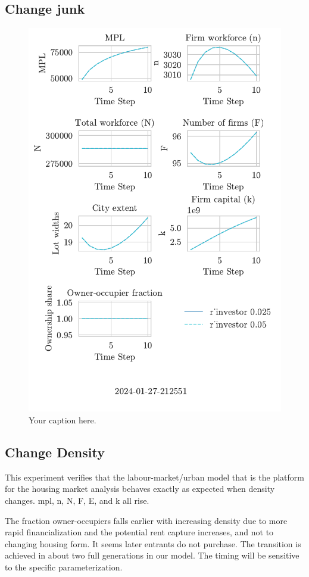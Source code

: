  \subsection{Change junk}
\begin{figure}
  \centering
  \includegraphics[width=.6\textwidth, clip, trim=0 20mm 0 0]{fig/plots/timeseries-plots-2024-01-27-212551.pdf}
  \caption{Your caption here.}
  \label{fig:your-label}
\end{figure}

 \subsection{Change Density}
 This experiment verifies that the labour-market/urban model that is the platform for the housing market analysis behaves exactly as expected when density changes. mpl, n, N, F, E, and k all rise. %

 The fraction owner-occupiers falls earlier with increasing density due to more rapid financialization and the potential rent capture increases, and not to changing housing form. It seems later entrants do not purchase. The transition is achieved in about two full generations in our model. The timing will be sensitive to the specific parameterization.
 


